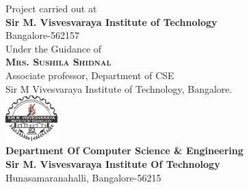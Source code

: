 \begin{titlepage}
	\Large{Project carried out at\\
		\textbf{Sir M. Visvesvaraya Institute of Technology}
		\\Bangalore-562157
	}\\[10pt]
	\Large{Under the Guidance of\\
		\textbf{\textsc{\Large Mrs. Sushila Shidnal }}\\
		Associate professor, Department of CSE\\
		Sir M Vivesvaraya Institute of Technology, Bangalore.
	}\\[10pt]
	\includegraphics[width=0.15\textwidth]{mvit.png}\\[10pt] 
	\Large{
		\textbf{Department Of Computer Science \& Engineering}\\
		\textbf{Sir M. Visvesvaraya Institute Of Technology}\\
		Hunasamaranahalli, Bangalore-56215\\
	}

\end{titlepage}

